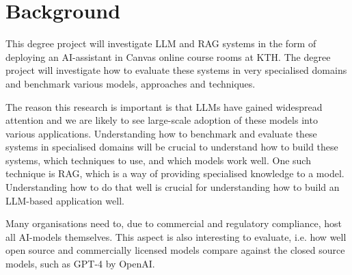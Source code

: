 



\section{Background}
\label{sec:background}


This degree project will investigate \gls{LLM} and \gls{RAG} systems in the form of deploying an AI-assistant in Canvas online course rooms at KTH. The degree project will investigate how to evaluate these systems in very specialised domains and benchmark various models, approaches and techniques.

The reason this research is important is that \gls{LLM}s have gained widespread attention and we are likely to see large-scale adoption of these models into various applications. Understanding how to benchmark and evaluate these systems in specialised domains will be crucial to understand how to build these systems, which techniques to use, and which models work well. One such technique is \gls{RAG}, which is a way of providing specialised knowledge to a model. Understanding how to do that well is crucial for understanding how to build an \gls{LLM}-based application well.


Many organisations need to, due to commercial and regulatory compliance, host all AI-models themselves. This aspect is also interesting to evaluate, i.e. how well open source and commercially licensed models compare against the closed source models, such as GPT-4 by OpenAI.




